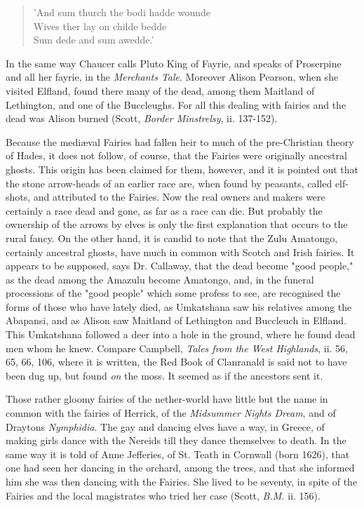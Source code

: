 \documentclass[14pt,a4paper]{memoir}
\begin{document}
{\begin{verse}
  \small
'And sum thurch the bodi hadde wounde \\
Wives ther lay on childe bedde \\
Sum dede and sum awedde.'
\end{verse}

In the same way Chaucer calls Pluto \textquotesingle King of
Fayrie,\textquotesingle{} and speaks of \textquotesingle Proserpine and
all her fayrie,\textquotesingle{} in the
\emph{Merchant\textquotesingle s Tale}. Moreover Alison Pearson, when
she visited Elfland, found there many of the dead, among them Maitland
of Lethington, and one of the Buccleughs. For all this dealing with
fairies and the dead was Alison burned (Scott, \emph{Border Minstrelsy},
ii. 137-152).

Because the mediæval Fairies had fallen heir to much of the
pre-Christian theory of Hades, it does not follow, of course, that the
Fairies were originally ancestral ghosts. This origin has been claimed
for them, however, and it is pointed out that the stone arrow-heads of
an earlier race are, when found by peasants, called
\textquotesingle elf-shots,\textquotesingle{} and attributed to the
Fairies. Now the real owners and makers were certainly a race dead and
gone, as far as a race can die. But probably the ownership of the arrows
by elves is only the first explanation that occurs to the rural fancy.
On the other hand, it is candid to note that the Zulu Amatongo,
certainly \textquotesingle ancestral ghosts,\textquotesingle{} have much
in common with Scotch and Irish fairies. \textquotesingle It appears to
be supposed,\textquotesingle{} says Dr. Callaway, \textquotesingle that
the dead become "good people," as the dead among the Amazulu become
Amatongo, and, in the funeral processions of the "good people" which
some profess to see, are recognised the forms of those who have lately
died, as Umkatshana saw his relatives among the
Abapansi,\textquotesingle{} and as Alison saw Maitland of Lethington and
Buccleuch in Elfland. This Umkatshana followed a deer into a hole in the
ground, where he found dead men whom he
knew.
Compare Campbell, \emph{Tales from the West Highlands}, ii. 56, 65, 66,
106, where it is written, \textquotesingle the Red Book of Clanranald is
said not to have been dug up, but found \emph{on} the moss. It seemed as
if the ancestors sent it.\textquotesingle{}

Those rather gloomy fairies of the nether-world have little but the name
in common with the fairies of Herrick, of the \emph{Midsummer
Night\textquotesingle s Dream}, and of Drayton\textquotesingle s
\emph{Nymphidia}. The gay and dancing elves have a way, in Greece, of
making girls \textquotesingle dance with the Nereids\textquotesingle{}
till they dance themselves to death. In the same way it is told of Anne
Jefferies, of St. Teath in Cornwall (born 1626), that one had seen her
\textquotesingle dancing in the orchard, among the trees, and that she
informed him she was then dancing with the Fairies.\textquotesingle{}
She lived to be seventy, in spite of the Fairies and the local
magistrates who tried her case (Scott, \emph{B.M.} ii. 156).

}
\end{document}

